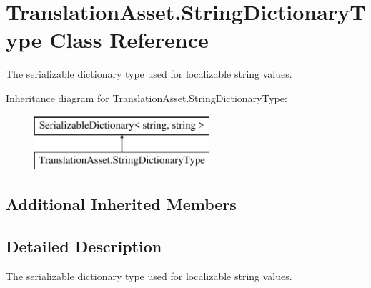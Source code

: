 \hypertarget{class_translation_asset_1_1_string_dictionary_type}{}\section{Translation\+Asset.\+String\+Dictionary\+Type Class Reference}
\label{class_translation_asset_1_1_string_dictionary_type}


The serializable dictionary type used for localizable string values.  


Inheritance diagram for Translation\+Asset.\+String\+Dictionary\+Type\+:\begin{figure}[H]
\begin{center}
\leavevmode
\includegraphics[height=2.000000cm]{class_translation_asset_1_1_string_dictionary_type}
\end{center}
\end{figure}
\subsection*{Additional Inherited Members}


\subsection{Detailed Description}
The serializable dictionary type used for localizable string values. 

